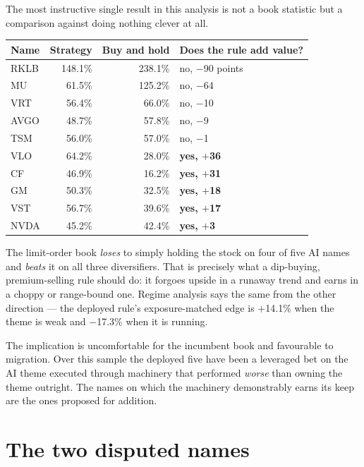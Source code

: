 \documentclass[11pt]{article}
\begin{document}
The most instructive single result in this analysis is not a book statistic but a comparison
against doing nothing clever at all.

\begin{table}[H]\centering\small
\begin{tabular}{lrrl}
\toprule
\textbf{Name} & \textbf{Strategy} & \textbf{Buy and hold} & \textbf{Does the rule add value?} \\
\midrule
RKLB & 148.1\% & 238.1\% & no, $-$90 points \\
MU   &  61.5\% & 125.2\% & no, $-$64 \\
VRT  &  56.4\% &  66.0\% & no, $-$10 \\
AVGO &  48.7\% &  57.8\% & no, $-$9 \\
TSM  &  56.0\% &  57.0\% & no, $-$1 \\
\midrule
\rowcolor{bccream} VLO &  64.2\% & 28.0\% & \textbf{yes, $+$36} \\
\rowcolor{bccream} CF  &  46.9\% & 16.2\% & \textbf{yes, $+$31} \\
\rowcolor{bccream} GM  &  50.3\% & 32.5\% & \textbf{yes, $+$18} \\
\rowcolor{bccream} VST &  56.7\% & 39.6\% & \textbf{yes, $+$17} \\
\rowcolor{bccream} NVDA&  45.2\% & 42.4\% & \textbf{yes, $+$3} \\
\bottomrule
\end{tabular}
\end{table}

The limit-order book \emph{loses} to simply holding the stock on four of five AI names and
\emph{beats} it on all three diversifiers. That is precisely what a dip-buying,
premium-selling rule should do: it forgoes upside in a runaway trend and earns in a choppy or
range-bound one. Regime analysis says the same from the other direction --- the deployed rule's
exposure-matched edge is $+$14.1\% when the theme is weak and $-$17.3\% when it is running.

The implication is uncomfortable for the incumbent book and favourable to migration. Over this
sample the deployed five have been a leveraged bet on the AI theme executed through machinery
that performed \emph{worse} than owning the theme outright. The names on which the machinery
demonstrably earns its keep are the ones proposed for addition.

\section{The two disputed names}
\end{document}
